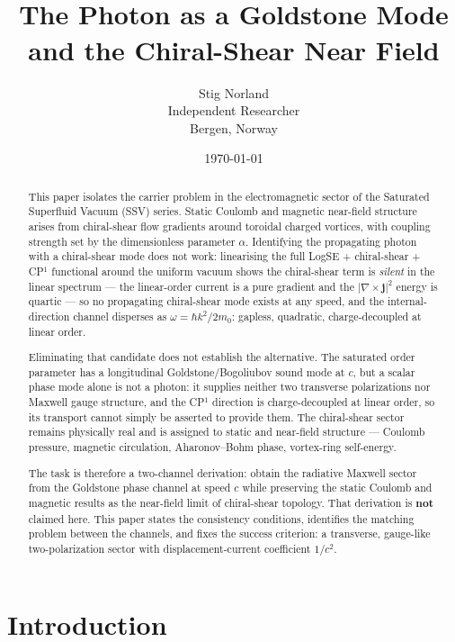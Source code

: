 \documentclass[11pt,a4paper]{article}
\title{\textbf{\seriesname~\papernumber}\\[0.4em]
The Photon as a Goldstone Mode and the Chiral-Shear Near Field}
\author{Stig Norland \\ Independent Researcher \\ Bergen, Norway}
\date{\today}
\begin{document}
\maketitle

\begin{abstract}
This paper isolates the carrier problem in the electromagnetic sector of the
Saturated Superfluid Vacuum (SSV) series.  Static Coulomb and magnetic
near-field structure arises from chiral-shear flow gradients around toroidal
charged vortices, with coupling strength set by the dimensionless parameter
$\alpha$.  Identifying the propagating photon with a chiral-shear mode does not
work: linearising the full LogSE + chiral-shear + CP$^1$ functional around the
uniform vacuum shows the chiral-shear term is \emph{silent} in the linear
spectrum --- the linear-order current is a pure gradient and the
$|\nabla\times\mathbf{j}|^2$ energy is quartic --- so no propagating
chiral-shear mode exists at any speed, and the internal-direction channel
disperses as $\omega=\hbar k^2/2m_0$: gapless, quadratic, charge-decoupled at
linear order.

Eliminating that candidate does not establish the alternative.  The saturated
order parameter has a longitudinal Goldstone/Bogoliubov sound mode at $c$, but
a scalar phase mode alone is not a photon: it supplies neither two transverse
polarizations nor Maxwell gauge structure, and the CP$^1$ direction is
charge-decoupled at linear order, so its transport cannot simply be asserted to
provide them.  The chiral-shear sector remains physically real and is assigned
to static and near-field structure --- Coulomb pressure, magnetic circulation,
Aharonov--Bohm phase, vortex-ring self-energy.

The task is therefore a two-channel derivation: obtain the radiative Maxwell
sector from the Goldstone phase channel at speed $c$ while preserving the
static Coulomb and magnetic results as the near-field limit of chiral-shear
topology.  That derivation is \textbf{not} claimed here.  This paper states the
consistency conditions, identifies the matching problem between the channels,
and fixes the success criterion: a transverse, gauge-like two-polarization
sector with displacement-current coefficient $1/c^2$.
\end{abstract}

\newpage
\tableofcontents
\newpage

\section{Introduction}
\label{sec:introduction}
\end{document}
